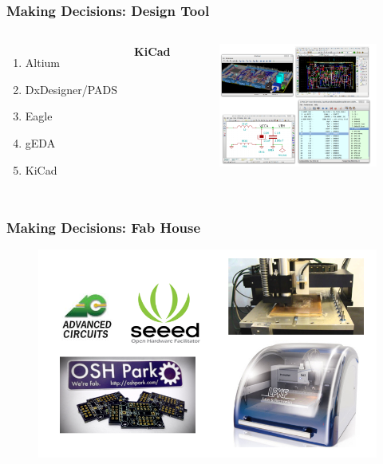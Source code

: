 \documentclass{beamer}
\begin{document}
\begin{frame}
\frametitle{Making Decisions: Design Tool}
\begin{columns}[t] %

\begin{enumerate}
\item{Altium}
\item{DxDesigner/PADS}
\newline
\item{Eagle}
\newline
\item{gEDA}
\item{KiCad}
\end{enumerate}

\centerline{\textbf{KiCad}}
\begin{figure}
\includegraphics[width=0.8\linewidth]{kicad.png}
\end{figure}

\end{columns}
\end{frame}

\begin{frame}
\frametitle{Making Decisions: Fab House}
 
\begin{figure}
\includegraphics[width=0.9\linewidth]{fabs.png}
\end{figure}

\end{frame}
\end{document}
